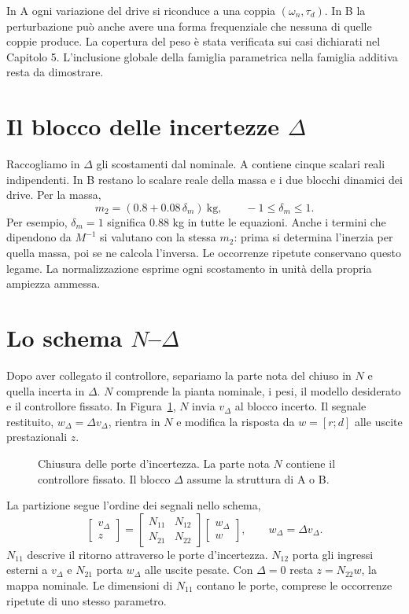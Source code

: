 In A ogni variazione del drive si riconduce a una coppia
$(\omega_n,\tau_d)$. In B la perturbazione può anche avere una forma
frequenziale che nessuna di quelle coppie produce. La copertura del
peso è stata verificata sui casi dichiarati nel Capitolo 5.
L'inclusione globale della famiglia parametrica nella famiglia
additiva resta da dimostrare.

\section{Il blocco delle incertezze \texorpdfstring{$\Delta$}{Delta}}

Raccogliamo in $\Delta$ gli scostamenti dal nominale. A contiene
cinque scalari reali indipendenti. In B restano lo scalare reale
della massa e i due blocchi dinamici dei drive. Per la massa,
\[
 m_2=(0.8+0.08\,\delta_m)\ \mathrm{kg},
 \qquad -1\leq\delta_m\leq1.
\]
Per esempio, $\delta_m=1$ significa $0.88$ kg in tutte le equazioni.
Anche i termini che dipendono da $M^{-1}$ si valutano con la stessa
$m_2$: prima si determina l'inerzia per quella massa, poi se ne
calcola l'inversa. Le occorrenze ripetute conservano questo legame.
La normalizzazione esprime ogni scostamento in unità della propria
ampiezza ammessa.

\section{Lo schema \texorpdfstring{$N$--$\Delta$}{N--Delta}}

Dopo aver collegato il controllore, separiamo la parte nota del chiuso
in $N$ e quella incerta in $\Delta$. $N$ comprende la pianta nominale,
i pesi, il modello desiderato e il controllore fissato. In
Figura~\ref{fig:ndelta}, $N$ invia $v_\Delta$ al blocco incerto. Il
segnale restituito, $w_\Delta=\Delta v_\Delta$, rientra in $N$ e modifica
la risposta da $w=[r;d]$ alle uscite prestazionali $z$.

\begin{figure}[!htb]\centering
\resizebox{.86\linewidth}{!}{}
\caption{Chiusura delle porte d'incertezza. La parte nota $N$ contiene
il controllore fissato. Il blocco $\Delta$ assume la struttura di A o B.}
\label{fig:ndelta}
\end{figure}

La partizione segue l'ordine dei segnali nello schema,
\[
 \begin{bmatrix}v_\Delta\\z\end{bmatrix}
 =\begin{bmatrix}N_{11}&N_{12}\\N_{21}&N_{22}\end{bmatrix}
 \begin{bmatrix}w_\Delta\\w\end{bmatrix},
 \qquad w_\Delta=\Delta v_\Delta .
\]
$N_{11}$ descrive il ritorno attraverso le porte d'incertezza.
$N_{12}$ porta gli ingressi esterni a $v_\Delta$ e $N_{21}$ porta
$w_\Delta$ alle uscite pesate. Con $\Delta=0$ resta $z=N_{22}w$,
la mappa nominale. Le dimensioni di $N_{11}$ contano le porte,
comprese le occorrenze ripetute di uno stesso parametro.

